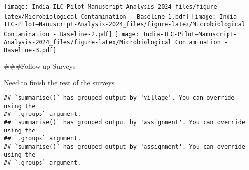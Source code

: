 \documentclass[
]{article}
\begin{document}
\texttt{[image: India-ILC-Pilot---Manuscript-Analysis-2024\_files/figure-latex/Microbiological Contamination - Baseline-1.pdf]}
\texttt{[image: India-ILC-Pilot---Manuscript-Analysis-2024\_files/figure-latex/Microbiological Contamination - Baseline-2.pdf]}
\texttt{[image: India-ILC-Pilot---Manuscript-Analysis-2024\_files/figure-latex/Microbiological Contamination - Baseline-3.pdf]}

\#\#\#Follow-up Surveys

Need to finish the rest of the surveys

\begin{verbatim}
## `summarise()` has grouped output by 'village'. You can override using the
## `.groups` argument.
## `summarise()` has grouped output by 'assignment'. You can override using the
## `.groups` argument.
## `summarise()` has grouped output by 'assignment'. You can override using the
## `.groups` argument.
\end{verbatim}
\end{document}
